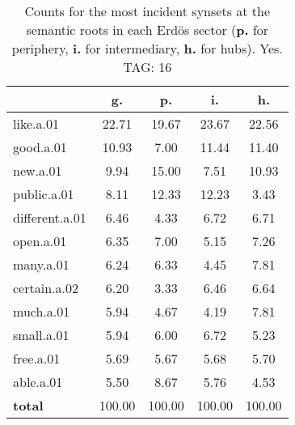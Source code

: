 \begin{table}[h!]
\begin{center}
\begin{tabular}{| l || c | c | c | c |}\hline
 & {\bf g.} & {\bf p.} & {\bf i.} & {\bf h.} \\\hline\hline
like.a.01 & 22.71  & 19.67  & 23.67  & 22.56 \\\hline
good.a.01 & 10.93  & 7.00  & 11.44  & 11.40 \\\hline
new.a.01 & 9.94  & 15.00  & 7.51  & 10.93 \\\hline
public.a.01 & 8.11  & 12.33  & 12.23  & 3.43 \\\hline
different.a.01 & 6.46  & 4.33  & 6.72  & 6.71 \\\hline
open.a.01 & 6.35  & 7.00  & 5.15  & 7.26 \\\hline
many.a.01 & 6.24  & 6.33  & 4.45  & 7.81 \\\hline
certain.a.02 & 6.20  & 3.33  & 6.46  & 6.64 \\\hline
much.a.01 & 5.94  & 4.67  & 4.19  & 7.81 \\\hline
small.a.01 & 5.94  & 6.00  & 6.72  & 5.23 \\\hline
free.a.01 & 5.69  & 5.67  & 5.68  & 5.70 \\\hline
able.a.01 & 5.50  & 8.67  & 5.76  & 4.53 \\\hline\hline
{{\bf total}} & 100.00  & 100.00  & 100.00  & 100.00 \\\hline
\end{tabular}
\caption{Counts for the most incident synsets at the semantic roots in each Erd\"os sector ({\bf p.} for periphery, {\bf i.} for intermediary, {\bf h.} for hubs). Yes. TAG: 16}
\end{center}
\end{table}